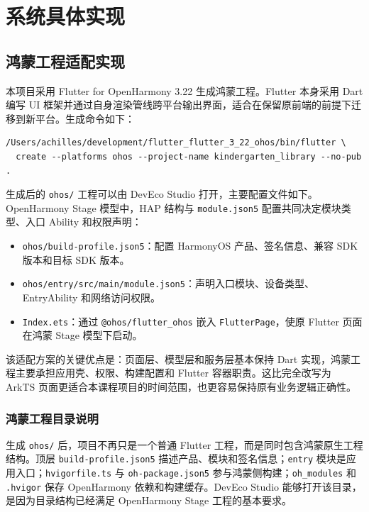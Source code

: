 
\chapter{系统具体实现}

\section{鸿蒙工程适配实现}

本项目采用 Flutter for OpenHarmony 3.22 生成鸿蒙工程。Flutter 本身采用 Dart 编写 UI 框架并通过自身渲染管线跨平台输出界面，适合在保留原前端的前提下迁移到新平台\cite{flutter_architecture_overview}。生成命令如下：

\begin{lstlisting}[style=codexcode]
/Users/achilles/development/flutter_flutter_3_22_ohos/bin/flutter \
  create --platforms ohos --project-name kindergarten_library --no-pub .
\end{lstlisting}

生成后的 \texttt{ohos/} 工程可以由 DevEco Studio 打开，主要配置文件如下。OpenHarmony Stage 模型中，HAP 结构与 \texttt{module.json5} 配置共同决定模块类型、入口 Ability 和权限声明\cite{openharmony_package_structure_stage,openharmony_module_config,openharmony_hap_package}：

\begin{itemize}
    \item \texttt{ohos/build-profile.json5}：配置 HarmonyOS 产品、签名信息、兼容 SDK 版本和目标 SDK 版本。
    \item \texttt{ohos/entry/src/main/module.json5}：声明入口模块、设备类型、EntryAbility 和网络访问权限。
    \item \texttt{Index.ets}：通过 \texttt{@ohos/flutter\_ohos} 嵌入 \texttt{FlutterPage}，使原 Flutter 页面在鸿蒙 Stage 模型下启动。
\end{itemize}

该适配方案的关键优点是：页面层、模型层和服务层基本保持 Dart 实现，鸿蒙工程主要承担应用壳、权限、构建配置和 Flutter 容器职责。这比完全改写为 ArkTS 页面更适合本课程项目的时间范围，也更容易保持原有业务逻辑正确性。

\subsection{鸿蒙工程目录说明}

生成 \texttt{ohos/} 后，项目不再只是一个普通 Flutter 工程，而是同时包含鸿蒙原生工程结构。顶层 \texttt{build-profile.json5} 描述产品、模块和签名信息；\texttt{entry} 模块是应用入口；\texttt{hvigorfile.ts} 与 \texttt{oh-package.json5} 参与鸿蒙侧构建；\texttt{oh\_modules} 和 \texttt{.hvigor} 保存 OpenHarmony 依赖和构建缓存。DevEco Studio 能够打开该目录，是因为目录结构已经满足 OpenHarmony Stage 工程的基本要求。

